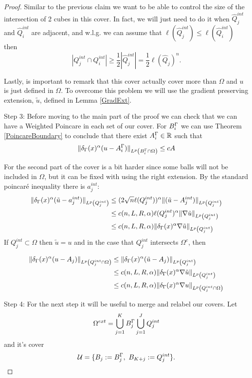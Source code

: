 \begin{proof}
Similar to the previous claim we want to be able to control the size of the intersection of 2 cubes in this cover. In fact, we will just need to do it when $\hat{Q}^{int}_{j}$ and $\hat{Q}^{int}_{i}$ are adjacent, and w.l.g. we can assume that $\ell(\hat{Q}^{int}_{j})\leq \ell(\hat{Q}^{int}_{i}) $
then
$$|{Q}^{int}_{j}\cap {Q}^{int}_{i}|\geq \frac{1}{2}|\hat{Q}^{int}_{j}| =\frac{1}{2} \ell(\hat{Q}_j)^n.$$

Lastly, is important to remark that this cover actually cover more than $\Omega$ and $u$ is just defined in $\Omega$. To overcome this problem we will use the gradient preserving extension, $\tilde{u}$, defined in Lemma \ref{GradExt}.


Step 3: Before moving to the main part of the proof we can check that we can have a Weighted Poincare in each set of our cover.  For $B^\Gamma_i$ we can use Theorem \ref{PoincareBoundary} to conclude that there exist $A^\Gamma_i\in \mathbb{R}$ such that
$$
\|\delta_\Gamma(x)^\alpha (u-A^\Gamma_i)\|_{L^p\left(B^\Gamma_i\cap \Omega\right)} \leq c A
$$

For the second part of the cover is a bit harder since some balls will not be included in $\Omega$,  but it can be fixed with using the right extension. By the standard  poincaré inequality there is $a^{int}_{j}$:
\begin{align*}
    \|\delta_\Gamma(x)^\alpha (\tilde{u}-a^{int}_j)\|_{L^p\left(Q^{int}_j\right)} &\leq (2\sqrt{n}\ell(Q^{int}_j))^\alpha\| (\tilde{u}-A^{int}_j)\|_{L^p\left(Q^{int}_j\right)}\\
    &\leq c(n,L,R,\alpha)\ell(Q^{int}_j)^\alpha\| \nabla \tilde{u}\|_{L^p\left(Q^{int}_j\right)}\\
    &\leq c(n,L,R,\alpha) \|\delta_\Gamma(x)^\alpha \nabla\tilde{u}\|_{L^p\left(Q^{int}_j\right)}
\end{align*}
If $Q^{int}_j\subset \Omega$ then $\tilde{u} = u$ and in the case that $Q^{int}_j$ intersects $\Omega^c$, then

\begin{align*}
    \|\delta_\Gamma(x)^\alpha (u-A_j)\|_{L^p\left(Q^{int}_j\cap \Omega \right)}&\leq \|\delta_\Gamma(x)^\alpha (\tilde{u}-A_j)\|_{L^p\left(Q^{int}_j\right)} \\
    &\leq c(n,L,R,\alpha) \|\delta_\Gamma(x)^\alpha \nabla\tilde{u}\|_{L^p\left(Q^{int}_j\right)}\\
    &\leq c(n,L,R,\alpha) \|\delta_\Gamma(x)^\alpha \nabla u\|_{L^p\left(Q^{int}_j\cap\Omega\right)}
\end{align*}


Step 4: For the next step it will be useful to merge and relabel our covers. Let $$\Omega^{ext}=\bigcup_{j=1}^K B^\Gamma_j\bigcup_{j=1}^J Q^{int}_j$$ and it's cover $$\mathcal{U}=\{B_j:=B^\GG_j,\ B_{K+j}:=Q^{int}_j\}.$$ 


\end{proof}
